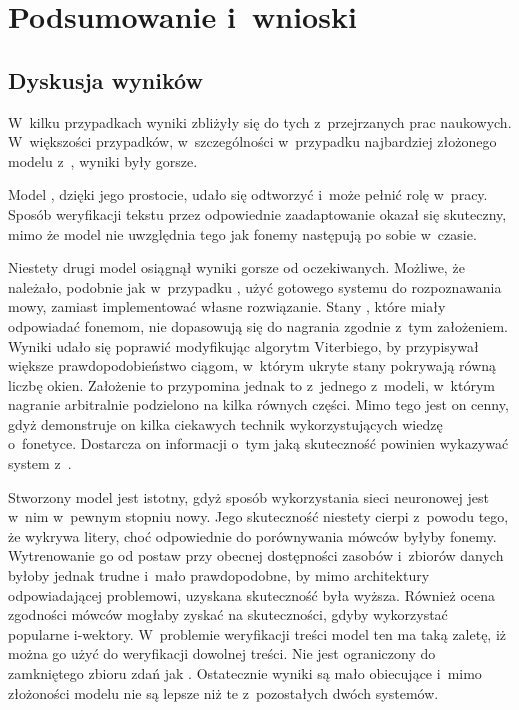 \chapter{Podsumowanie i~wnioski}\label{chap:podsumowanie}

\section{Dyskusja wyników}

W~kilku przypadkach wyniki zbliżyły się do tych z~przejrzanych prac naukowych. W~większości przypadków,
w~szczególności w~przypadku najbardziej złożonego modelu z~, wyniki były gorsze.

Model , dzięki jego prostocie, udało się odtworzyć i~może pełnić
rolę  w~pracy. Sposób weryfikacji tekstu przez odpowiednie zaadaptowanie 
okazał się skuteczny, mimo że model nie uwzględnia tego jak fonemy następują po sobie w~czasie.

Niestety drugi model  osiągnął wyniki gorsze od oczekiwanych.
Możliwe, że należało, podobnie jak w~przypadku , użyć gotowego systemu do rozpoznawania mowy,
zamiast implementować własne rozwiązanie.
Stany , które miały odpowiadać fonemom, nie dopasowują się do nagrania zgodnie z~tym założeniem.
Wyniki udało się poprawić modyfikując algorytm Viterbiego, by przypisywał większe prawdopodobieństwo
ciągom, w~którym ukryte stany pokrywają równą liczbę okien. Założenie to przypomina jednak to z~jednego
z~modeli, w~którym nagranie arbitralnie podzielono na kilka równych części. Mimo tego jest on cenny,
gdyż demonstruje on kilka ciekawych technik wykorzystujących wiedzę o~fonetyce. Dostarcza on informacji
o~tym jaką skuteczność powinien wykazywać system z~.

Stworzony model  jest istotny, gdyż sposób wykorzystania sieci neuronowej jest w~nim
w~pewnym stopniu nowy. Jego skuteczność niestety cierpi z~powodu tego, że 
wykrywa litery, choć odpowiednie do porównywania mówców byłyby fonemy. Wytrenowanie go od postaw przy
obecnej dostępności zasobów i~zbiorów danych byłoby jednak trudne i~mało prawdopodobne, by mimo
architektury odpowiadającej problemowi, uzyskana skuteczność była wyższa.
Również ocena zgodności mówców mogłaby zyskać na skuteczności, gdyby wykorzystać popularne i-wektory.
W~problemie weryfikacji treści model ten ma taką zaletę, iż można go użyć do weryfikacji
dowolnej treści. Nie jest ograniczony do zamkniętego zbioru zdań jak .
Ostatecznie wyniki są mało obiecujące i~mimo złożoności modelu nie są lepsze niż te
z~pozostałych dwóch systemów.

